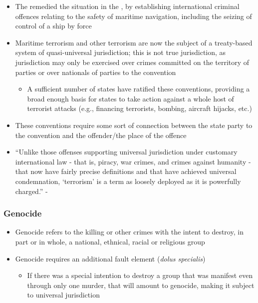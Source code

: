 \begin{itemize}
    \item The  remedied the situation in the , by establishing international criminal offences relating to the safety of maritime navigation, including the seizing of control of a ship by force
    \item Maritime terrorism and other terrorism are now the subject of a treaty-based system of quasi-universal jurisdiction; this is not true jurisdiction, as jurisdiction may only be exercised over crimes committed on the territory of parties or over nationals of parties to the convention
    \begin{itemize}
        \item A sufficient number of states have ratified these conventions, providing a broad enough basis for states to take action against a whole host of terrorist attacks (e.g., financing terrorists, bombing, aircraft hijacks, etc.)
    \end{itemize}
    \item These conventions require some sort of connection between the state party to the convention and the offender/the place of the offence
    \item ``Unlike those offenses supporting universal jurisdiction under customary international law - that is, piracy, war crimes, and crimes against humanity - that now have fairly precise definitions and that have achieved universal condemnation, `terrorism' is a term as loosely deployed as it is powerfully charged.'' - 
\end{itemize}

\subsubsection{Genocide}
\begin{itemize}
    \item Genocide refers to the killing or other crimes with the intent to destroy, in part or in whole, a national, ethnical, racial or religious group
    \item Genocide requires an additional fault element (\textit{dolus specialis})
    \begin{itemize}
        \item If there was a special intention to destroy a group that was manifest even through only one murder, that will amount to genocide, making it subject to universal jurisdiction
    \end{itemize}
\end{itemize}

